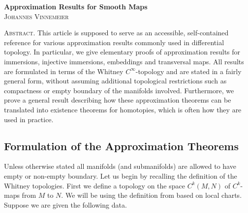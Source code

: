 \begin{center}
    \Large \textbf{Approximation Results for Smooth Maps} \\[.5em]
    \large\textsc{Johannes Vinnemeier} \\
\end{center}

\vspace{1em}

{\small \noindent \textsc{Abstract.} This article is supposed to serve as an accessible, self-contained reference for various approximation results commonly used in differential topology. In particular, we give elementary proofs of approximation results for immersions, injective immersions, embeddings and transversal maps. All results are formulated in terms of the Whitney $C^\infty$-topology and are stated in a fairly general form, without assuming additional topological restrictions such as compactness or empty boundary of the manifolds involved. Furthermore, we prove a general result describing how these approximation theorems can be translated into existence theorems for homotopies, which is often how they are used in practice.} 

\vspace{1em}


\subsection{Formulation of the Approximation Theorems}

Unless otherwise stated all manifolds (and submanifolds) are allowed to have empty or non-empty boundary. Let us begin by recalling the definition of the Whitney topologies. First we define a topology on the space $C^k(M,N)$ of $C^k$-maps from $M$ to $N$. We will be using the definition from \cite{hirsch2012differential} based on local charts. Suppose we are given the following data.

